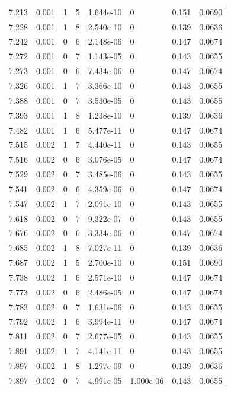 \documentclass[preview]{standalone}
\begin{document}
{{{{{{{\begin{tabular}{L{1.2cm}C{1.2cm} C{0.3cm}C{0.5cm} C{1.4cm}C{1.4cm} C{1.4cm}C{1.4cm}}
  7.213  &  0.001  & 1     &  5 &  1.644e-10  & 0  & 0.151 &  0.0690   \\ 
  7.228  &  0.001  & 1     &  8 &  2.540e-10  & 0  & 0.139 &  0.0636   \\ 
  7.242  &  0.001  & 0     &  6 &  2.148e-06  & 0  & 0.147 &  0.0674   \\ 
  7.272  &  0.001  & 0     &  7 &  1.143e-05  & 0  & 0.143 &  0.0655   \\ 
  7.273  &  0.001  & 0     &  6 &  7.434e-06  & 0  & 0.147 &  0.0674   \\ 
  7.326  &  0.001  & 1     &  7 &  3.366e-10  & 0  & 0.143 &  0.0655   \\ 
  7.388  &  0.001  & 0     &  7 &  3.530e-05  & 0  & 0.143 &  0.0655   \\ 
  7.393  &  0.001  & 1     &  8 &  1.238e-10  & 0  & 0.139 &  0.0636   \\ 
  7.482  &  0.001  & 1     &  6 &  5.477e-11  & 0  & 0.147 &  0.0674   \\ 
  7.515  &  0.002  & 1     &  7 &  4.440e-11  & 0  & 0.143 &  0.0655   \\ 
  7.516  &  0.002  & 0     &  6 &  3.076e-05  & 0  & 0.147 &  0.0674   \\ 
  7.529  &  0.002  & 0     &  7 &  3.485e-06  & 0  & 0.143 &  0.0655   \\ 
  7.541  &  0.002  & 0     &  6 &  4.359e-06  & 0  & 0.147 &  0.0674   \\ 
  7.547  &  0.002  & 1     &  7 &  2.091e-10  & 0  & 0.143 &  0.0655   \\ 
  7.618  &  0.002  & 0     &  7 &  9.322e-07  & 0  & 0.143 &  0.0655   \\ 
  7.676  &  0.002  & 0     &  6 &  3.334e-06  & 0  & 0.147 &  0.0674   \\ 
  7.685  &  0.002  & 1     &  8 &  7.027e-11  & 0  & 0.139 &  0.0636   \\ 
  7.687  &  0.002  & 1     &  5 &  2.700e-10  & 0  & 0.151 &  0.0690   \\ 
  7.738  &  0.002  & 1     &  6 &  2.571e-10  & 0  & 0.147 &  0.0674   \\ 
  7.773  &  0.002  & 0     &  6 &  2.486e-05  & 0  & 0.147 &  0.0674   \\ 
  7.783  &  0.002  & 0     &  7 &  1.631e-06  & 0  & 0.143 &  0.0655   \\ 
  7.792  &  0.002  & 1     &  6 &  3.994e-11  & 0  & 0.147 &  0.0674   \\ 
  7.811  &  0.002  & 0     &  7 &  2.677e-05  & 0  & 0.143 &  0.0655   \\ 
  7.891  &  0.002  & 1     &  7 &  4.141e-11  & 0  & 0.143 &  0.0655   \\ 
  7.897  &  0.002  & 1     &  8 &  1.297e-09  & 0  & 0.139 &  0.0636   \\ 
  7.897  &  0.002  & 0     &  7 &  4.991e-05  & 1.000e-06  & 0.143 &  0.0655   \\ 
\hline 
\end{tabular} 

}}}}}}}
\end{document}
